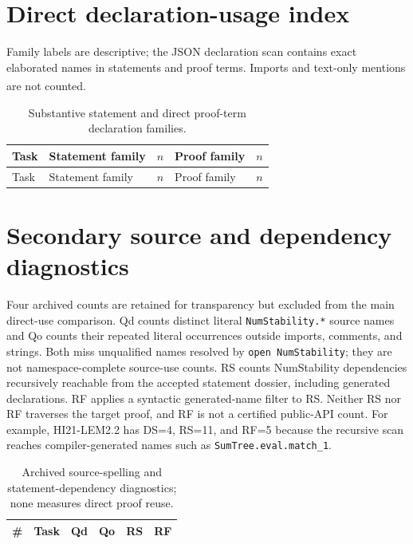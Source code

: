 \documentclass[10pt,a4paper]{article}
\newcommand{\src}[1]{\textsuperscript{\cite{#1}}}
\begin{document}
\clearpage
\section{Direct declaration-usage index}

Family labels are descriptive; the JSON declaration scan contains exact
elaborated names in statements and proof terms. Imports and text-only
mentions are not counted.\src{declscan,taskledger}

\small
\begin{longtable}{@{}p{}p{}rp{}r@{}}
\caption{Substantive statement and direct proof-term declaration families.
\cite{declscan,plotcode}}\\
\toprule Task & Statement family & $n$ & Proof family & $n$\\\midrule\endfirsthead
\toprule Task & Statement family & $n$ & Proof family & $n$\\\midrule\endhead

\end{longtable}
\normalsize

\clearpage
\section{Secondary source and dependency diagnostics}\label{app:secondarymetrics}

Four archived counts are retained for transparency but excluded from the
main direct-use comparison. Qd counts distinct literal
\texttt{NumStability.*} source names and Qo counts their repeated literal
occurrences outside imports, comments, and strings. Both miss unqualified
names resolved by \texttt{open NumStability}; they are not namespace-complete
source-use counts. RS counts NumStability dependencies recursively reachable
from the accepted statement dossier, including generated declarations. RF
applies a syntactic generated-name filter to RS. Neither RS nor RF traverses
the target proof, and RF is not a certified public-API count. For example,
HI21-LEM2.2 has DS=4, RS=11, and RF=5 because the recursive scan reaches
compiler-generated names such as \texttt{SumTree.eval.match\_1}.
\cite{usagepoints,metriccode,declscan}

\begin{table}[H]\centering\small
\begin{tabular}{@{}rlrrrr@{}}\toprule
\# & Task & Qd & Qo & RS & RF\\\midrule

\end{tabular}
\caption{Archived source-spelling and statement-dependency diagnostics;
none measures direct proof reuse.\cite{usagepoints,metriccode}}
\label{tab:suppcounts}
\end{table}
\end{document}
